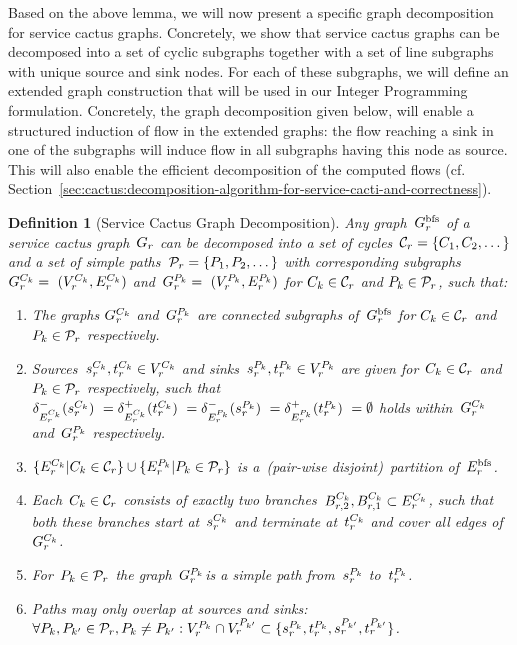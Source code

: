 \documentclass[10pt, conference, letterpaper]{IEEEtran}
\newtheorem{definition}[theorem]{Definition}
\begin{document}
Based on the above lemma, we will now present a specific graph decomposition for service cactus graphs. Concretely, we show that service cactus graphs can be decomposed into a set of cyclic subgraphs together with a set of line subgraphs with unique source and sink nodes. For each of these subgraphs, we will define an extended graph construction that will be used in our Integer Programming formulation. Concretely, the graph decomposition given below, will enable a structured induction of flow in the extended graphs: the flow reaching a sink in one of the subgraphs will induce flow in all subgraphs having this node as source. This will also enable the efficient decomposition of the computed flows (cf. Section~\ref{sec:cactus:decomposition-algorithm-for-service-cacti-and-correctness}).

\begin{definition}[Service Cactus Graph Decomposition]
\label{def:service-cactus-graph-decomposition}
Any graph~$G^{\textnormal{bfs}}_{r}$ of a service cactus graph~$G_{r}$ can be decomposed into a set of cycles~$\Cycles = \{C_1, C_2, \dots \}$ and a set of simple paths~$\Paths = \{P_1, P_2, \dots\}$ with corresponding subgraphs $\VGcycle =~(\VVcycle, \VEcycle)$ and~$\VGpath =~(\VVpath, \VEpath)$ for $C_k \in \Cycles$ and $P_k \in \Paths$, such that:
\begin{enumerate}
\item The graphs $\VGcycle$ and~$\VGpath$ are \emph{connected} subgraphs of~$G^{\textnormal{bfs}}_{r}$ for $C_k \in \Cycles$ and $P_k \in \Paths$ respectively.
\item Sources~$\VVcycleSource, \VVcycleTarget \in \VVcycle$ and sinks~$\VVpathSource, \VVpathTarget \in \VVpath$ are given for~$C_k \in \Cycles$ and~$P_k \in \Paths$ respectively, such that~$\delta_{\VEcycle}^-(\VVcycleSource)~=  \delta_{\VEcycle}^+(\VVcycleTarget)~= \delta_{\VEpath}^-(\VVpathSource)~= \delta_{\VEpath}^+(\VVpathTarget)~= \emptyset$ holds within~$\VGcycle$ and~$\VGpath$ respectively.
\item $\{\VEcycle | C_k \in \Cycles\} \cup \{\VEpath | P_k \in \Paths\}$ is a~(pair-wise disjoint)~partition of~$E^{\textnormal{bfs}}_{r}$.
\item Each~$C_k \in \Cycles$ consists of exactly two branches~$\VEcycleBranchL, \VEcycleBranchR \subset \VEcycle$, such that both these branches start at~$\VVcycleSource$ and terminate at~$\VVcycleTarget$ and cover all edges of~$\VGcycle$.
\item For~$P_k \in \Paths$ the graph~$\VGpath$is a simple path from~$\VVpathSource$ to~$\VVpathTarget$.
\item Paths may only overlap at sources and sinks:~$\forall P_k, P_{k'} \in \Paths, P_k \neq P_{k'}: \VVpath \cap \VVpath[\req][k'] \subset \{\VVpathSource, \VVpathTarget, \VVpathSource[\req][k'], \VVpathTarget[\req][k']\}$.

\end{enumerate}
\end{definition}
\end{document}
